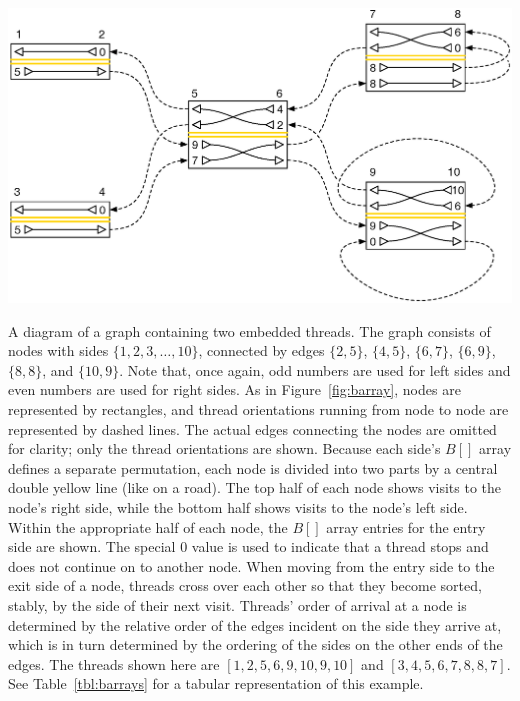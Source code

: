 \begin{FPfigure}
\centering
\includegraphics[width=\linewidth]{figures/03_gpbwt/bstylemultinode.eps}
\caption[A diagram of a graph containing two embedded threads]{A diagram of a graph containing two embedded threads. The graph consists of nodes with sides $\{1, 2, 3, \ldots, 10\}$, connected by edges $\{2, 5\}$, $\{4, 5\}$, $\{6, 7\}$, $\{6, 9\}$, $\{8, 8\}$, and $\{10, 9\}$. Note that, once again, odd numbers are used for left sides and even numbers are used for right sides. As in Figure~\ref{fig:barray}, nodes are represented by rectangles, and thread orientations running from node to node are represented by dashed lines. The actual edges connecting the nodes are omitted for clarity; only the thread orientations are shown. Because each side's $B[]$ array defines a separate permutation, each node is divided into two parts by a central double yellow line (like on a road). The top half of each node shows visits to the node's right side, while the bottom half shows visits to the node's left side. Within the appropriate half of each node, the $B[]$ array entries for the entry side are shown. The special $0$ value is used to indicate that a thread stops and does not continue on to another node. When moving from the entry side to the exit side of a node, threads cross over each other so that they become sorted, stably, by the side of their next visit. Threads' order of arrival at a node is determined by the relative order of the edges incident on the side they arrive at, which is in turn determined by the ordering of the sides on the other ends of the edges. The threads shown here are $[1, 2, 5, 6, 9, 10, 9, 10]$ and $[3, 4, 5, 6, 7, 8, 8, 7]$. See Table~\ref{tbl:barrays} for a tabular representation of this example.}
\label{fig:bstylemultinode}
\end{FPfigure}

